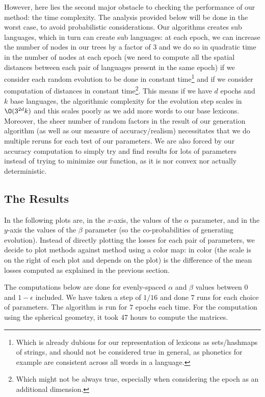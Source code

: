 \documentclass[math, info, english]{cours}
\begin{document}
However, here lies the second major obstacle to checking the performance of our method: the time complexity.
The analysis provided below will be done in the worst case, to avoid probabilistic considerations.
Our algorithms creates sub languages, which in turn can create sub languages: at each epoch, we can increase the number of nodes in our trees by a factor of $3$ and we do so in quadratic time in the number of nodes at each epoch (we need to compute all the spatial distances between each pair of languages present in the same epoch) if we consider each random evolution to be done in constant time\footnote{Which is already dubious for our representation of lexicons as sets/hashmaps of strings, and should not be considered true in general, as phonetics for example are consistent across all words in a language.}
and if we consider computation of distances in constant time\footnote{Which might not be always true, especially when considering the epoch as an additional dimension.}.
This means if we have $d$ epochs and $k$ base languages, the algorithmic complexity for the evolution step scales in $\O(3^{2d}k)$ and this scales poorly as we add more words to our base lexicons.
Moreover, the sheer number of random factors in the result of our generation algorithm (as well as our measure of accuracy/realism) necessitates that we do multiple reruns for each test of our parameters.
We are also forced by our accuracy computation to simply try and find results for lots of parameters instead of trying to minimize our function, as it is nor convex nor actually deterministic.

\subsection{The Results}
In the following plots are, in the $x$-axis, the values of the $\alpha$ parameter, and in the $y$-axis the values of the $\beta$ parameter (so the co-probabilities of generating evolution).
Instead of directly plotting the losses for each pair of parameters, we decide to plot methods against method using a color map: in color (the scale is on the right of each plot and depends on the plot) is the difference of the mean losses computed as explained in the previous section.

The computations below are done for evenly-spaced $\alpha$ and $\beta$ values between $0$ and $1 - \epsilon$ included. We have taken a step of $1/16$ and done $7$ runs for each choice of parameters.
The algorithm is run for $7$ epochs each time.
For the computation using the spherical geometry, it took 47 hours to compute the matrices.
\end{document}
